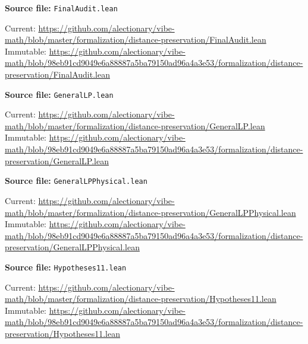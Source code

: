 \par\smallskip\noindent\begin{minipage}{\linewidth}\small\setlength{\baselineskip}{11pt}
\textbf{Source file:} \nolinkurl{FinalAudit.lean}\par\nopagebreak
Current: \url{https://github.com/alectionary/vibe-math/blob/master/formalization/distance-preservation/FinalAudit.lean}\\
Immutable: \url{https://github.com/alectionary/vibe-math/blob/98eb91cd9049e6a88887a5ba79150ad96a4a3e53/formalization/distance-preservation/FinalAudit.lean}\par\end{minipage}\par
\par\smallskip\noindent\begin{minipage}{\linewidth}\small\setlength{\baselineskip}{11pt}
\textbf{Source file:} \nolinkurl{GeneralLP.lean}\par\nopagebreak
Current: \url{https://github.com/alectionary/vibe-math/blob/master/formalization/distance-preservation/GeneralLP.lean}\\
Immutable: \url{https://github.com/alectionary/vibe-math/blob/98eb91cd9049e6a88887a5ba79150ad96a4a3e53/formalization/distance-preservation/GeneralLP.lean}\par\end{minipage}\par
\par\smallskip\noindent\begin{minipage}{\linewidth}\small\setlength{\baselineskip}{11pt}
\textbf{Source file:} \nolinkurl{GeneralLPPhysical.lean}\par\nopagebreak
Current: \url{https://github.com/alectionary/vibe-math/blob/master/formalization/distance-preservation/GeneralLPPhysical.lean}\\
Immutable: \url{https://github.com/alectionary/vibe-math/blob/98eb91cd9049e6a88887a5ba79150ad96a4a3e53/formalization/distance-preservation/GeneralLPPhysical.lean}\par\end{minipage}\par
\par\smallskip\noindent\begin{minipage}{\linewidth}\small\setlength{\baselineskip}{11pt}
\textbf{Source file:} \nolinkurl{Hypotheses11.lean}\par\nopagebreak
Current: \url{https://github.com/alectionary/vibe-math/blob/master/formalization/distance-preservation/Hypotheses11.lean}\\
Immutable: \url{https://github.com/alectionary/vibe-math/blob/98eb91cd9049e6a88887a5ba79150ad96a4a3e53/formalization/distance-preservation/Hypotheses11.lean}\par\end{minipage}\par
